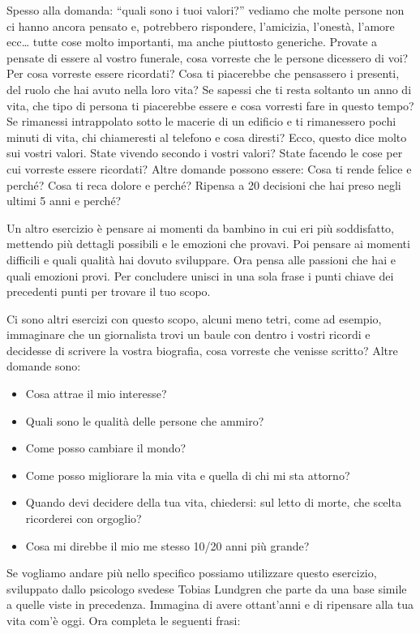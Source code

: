 \documentclass[12pt]{book} %
\begin{document}
Spesso alla domanda: “quali sono i tuoi valori?” vediamo che molte persone non ci hanno ancora pensato e, potrebbero rispondere,
l'amicizia, l'onestà, l'amore ecc… tutte cose molto
importanti, ma anche piuttosto generiche. Provate a pensate di essere al vostro funerale,
cosa vorreste che le persone dicessero di voi? Per cosa vorreste essere ricordati? Cosa ti piacerebbe che pensassero i
presenti, del ruolo che hai avuto nella loro vita? Se sapessi che ti resta soltanto un anno di vita, che tipo di
persona ti piacerebbe essere e cosa vorresti fare in questo tempo? Se rimanessi intrappolato sotto le macerie di un
edificio e ti rimanessero pochi minuti di vita, chi chiameresti al telefono e cosa diresti? Ecco, questo dice molto sui
vostri valori. State vivendo secondo i vostri valori? State facendo le cose per cui vorreste essere ricordati?
Altre domande possono essere:
Cosa ti rende felice e perché?
Cosa ti reca dolore e perché?
Ripensa a 20 decisioni che hai preso negli ultimi 5 anni e perché?

Un altro esercizio è pensare ai momenti da bambino in cui eri più soddisfatto, mettendo più dettagli possibili e le
emozioni che provavi. Poi pensare ai momenti difficili e quali qualità hai dovuto sviluppare. Ora pensa alle passioni
che hai e quali emozioni provi. Per concludere unisci in una sola frase i punti chiave dei precedenti punti per trovare
il tuo scopo.

Ci sono altri esercizi con questo scopo, alcuni meno tetri, come ad esempio, immaginare che un giornalista trovi un
baule con dentro i vostri ricordi e decidesse di scrivere la vostra biografia, cosa vorreste che venisse scritto? Altre
domande sono:

\begin{itemize}
\item Cosa attrae il mio interesse?
\item Quali sono le qualità delle persone che ammiro?
\item Come posso cambiare il mondo?
\item Come posso migliorare la mia vita e quella di chi mi sta attorno? 
\item Quando devi decidere della tua vita, chiedersi: sul letto di morte, che scelta ricorderei con orgoglio? 
\item Cosa mi direbbe il mio me stesso 10/20 anni più grande?
\end{itemize}
Se vogliamo andare più nello specifico possiamo utilizzare questo esercizio, sviluppato dallo psicologo svedese Tobias
Lundgren che parte da una base simile a quelle viste in precedenza. Immagina di avere ottant'anni
e di ripensare alla tua vita com'è oggi. Ora completa le seguenti frasi:
\end{document}
